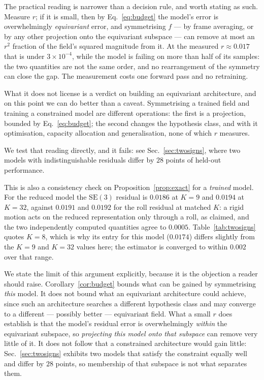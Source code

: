\documentclass[10pt,twocolumn,letterpaper]{article}
\theoremstyle{plain}
\newcommand{\SE}{\mathrm{SE}(3)}
\begin{document}
The practical reading is narrower than a decision rule, and worth stating as
such. Measure $r$; if it is small, then by
Eq.~\eqref{eq:budget} the model's error is overwhelmingly \emph{equivariant}
error, and symmetrising $f$ --- by frame averaging, or by any other projection
onto the equivariant subspace --- can remove at most an $r^2$ fraction of the
field's squared magnitude from it. At the measured $r\approx0.017$ that is under
$3\times10^{-4}$, while
the model is failing on more than half of its samples: the two quantities are not
the same order, and no rearrangement of the symmetry can close the gap. The
measurement costs one forward pass and no retraining.

What it does not license is a verdict on building an equivariant architecture,
and on this point we can do better than a caveat. Symmetrising a trained field
and training a constrained model are different operations: the first is a
projection, bounded by Eq.~\eqref{eq:budget}; the second changes the hypothesis
class, and with it optimisation, capacity allocation and generalisation, none of
which $r$ measures.

We test that reading directly, and it fails: see
Sec.~\ref{sec:twosigns}, where two models with indistinguishable residuals differ
by $28$ points of held-out performance.

This is also a consistency check on Proposition~\ref{prop:exact} for a
\emph{trained} model. For the reduced model the $\SE$ residual is $0.0186$ at
$K{=}9$ and $0.0194$ at $K{=}32$, against $0.0191$ and $0.0192$ for the roll
residual at matched $K$: a rigid motion acts on the reduced representation only
through a roll, as claimed, and the two independently computed quantities agree
to $0.0005$. Table~\ref{tab:twosigns} quotes $K{=}8$, which is why its entry for
this model ($0.0174$) differs slightly from the $K{=}9$ and $K{=}32$ values here;
the estimator is converged to within $0.002$ over that range.

We state the limit of this argument explicitly, because it is the objection a
reader should raise. Corollary~\ref{cor:budget} bounds what can be gained by
symmetrising \emph{this} model. It does not bound what an equivariant architecture
could achieve, since such an architecture searches a different hypothesis class
and may converge to a different --- possibly better --- equivariant field. What a
small $r$ does establish is that the model's residual error is overwhelmingly
\emph{within} the equivariant subspace, so \emph{projecting this model onto that
subspace} can remove very little of it. It does not follow that a constrained
architecture would gain little: Sec.~\ref{sec:twosigns} exhibits two models that
satisfy the constraint equally well and differ by $28$ points, so membership of
that subspace is not what separates them.
\end{document}
